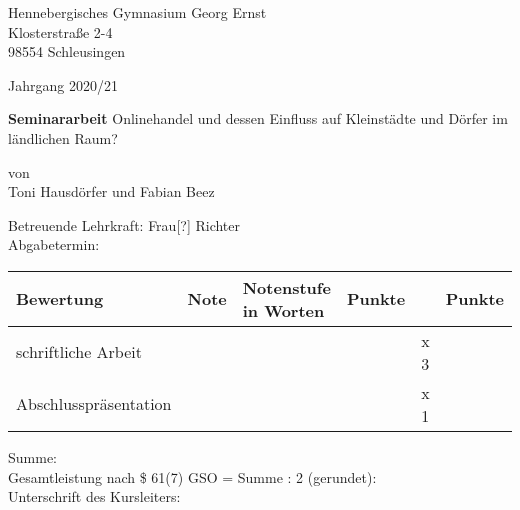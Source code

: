 \begin{titlepage}

    \raggedright
        Hennebergisches Gymnasium Georg Ernst\\
        Klosterstraße 2-4\\
        98554 Schleusingen
        
    \raggedleft\vspace*{-1.9cm}
        Jahrgang 2020/21
        
    
    \vfill\vfill\vfill\vfill\vfill\vfill

    \centering
        \LARGE\textbf{Seminararbeit}
        \vfill
        \large Onlinehandel und dessen Einfluss auf Kleinstädte und Dörfer im ländlichen Raum?\\[\baselineskip]\vfill
        
        von\\
        Toni Hausdörfer und Fabian Beez
    

    \vfill\vfill\vfill\vfill

    \raggedright
    Betreuende Lehrkraft:   Frau[?] Richter\\
    Abgabetermin:\\[\baselineskip]
    
\begin{tabular}[h]{|l|l|l|l|l|l|}
    \hline
    Bewertung & Note & Notenstufe in Worten & Punkte &  & Punkte \\
    \hline
    schriftliche Arbeit & & & & x 3 & \\
    \hline
    Abschlusspräsentation & & & & x 1 & \\
    \hline
\end{tabular}

\vfill

\raggedleft
    Summe:\\
    Gesamtleistung nach \$ 61(7) GSO = Summe : 2 (gerundet):\\[\baselineskip]\vfill
    Unterschrift des Kursleiters:
    
\vfill\vfill\vfill
\end{titlepage}
